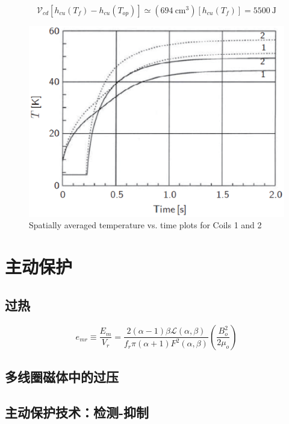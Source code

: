 \begin{equation}%
\mathcal{V}_{cd}[h_{cu}(T_f)-h_{cu}(T_{op})]\simeq(694\ \mathrm{cm^3})[h_{cu}(T_f)]=5500\ \mathrm{J}
\end{equation}




\begin{figure}
	\centering
	\includegraphics[scale=0.6]{chpt8/figs/fig8.16.eps}
	\caption{Spatially averaged temperature vs. time plots for Coils 1 and 2 }
\end{figure}







\section{主动保护}
\subsection{过热}
\begin{equation}%
e_{mr}\equiv\frac{E_m}{V_r}=\frac{2(\alpha-1)\beta\mathcal{L}(\alpha,\beta)}{f_r\pi(\alpha+1)F^2(\alpha,\beta)}\left(\frac{B_{o}^{2}}{2\mu_o}\right)
\end{equation}


\subsection{多线圈磁体中的过压}


\subsection{主动保护技术：检测-抑制}

